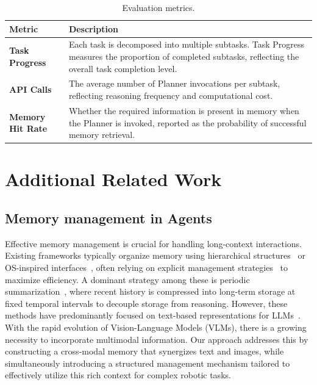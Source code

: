 \begin{table}[H]
\centering
\small
\setlength{\tabcolsep}{6pt}
\caption{Evaluation metrics.}
\begin{tabular}{p{3cm} p{9.2cm}}
\toprule
\textbf{Metric} & \textbf{Description} \\
\midrule
\textbf{Task Progress} & 
Each task is decomposed into multiple subtasks. Task Progress measures the proportion of completed subtasks, reflecting the overall task completion level. \\
\midrule
\textbf{API Calls} & 
The average number of Planner invocations per subtask, reflecting reasoning frequency and computational cost. \\
\midrule
\textbf{Memory Hit Rate} & 
Whether the required information is present in memory when the Planner is invoked, reported as the probability of successful memory retrieval. \\
\bottomrule
\end{tabular}
\label{tab:task_metrics}
\end{table}



\section{Additional Related Work}
\subsection{Memory management in Agents}
Effective memory management is crucial for handling long-context interactions. 
Existing frameworks typically organize memory using hierarchical structures~\cite{Liu2025MemVerseMM} or OS-inspired interfaces~\cite{Packer2023MemGPTTL}, often relying on explicit management strategies~\cite{Chhikara2025Mem0BP, Xu2025AMEMAM, Yan2025MemoryR1EL} to maximize efficiency.
A dominant strategy among these is periodic summarization~\cite{Long2025SeeingLR, Yeo2025WorldMMDM}, where recent history is compressed into long-term storage at fixed temporal intervals to decouple storage from reasoning.
However, these methods have predominantly focused on text-based representations for LLMs~\cite{Liang2023SCMEL}.
With the rapid evolution of Vision-Language Models (VLMs), there is a growing necessity to incorporate multimodal information.
Our approach addresses this by constructing a cross-modal memory that synergizes text and images, while simultaneously introducing a structured management mechanism tailored to effectively utilize this rich context for complex robotic tasks.

